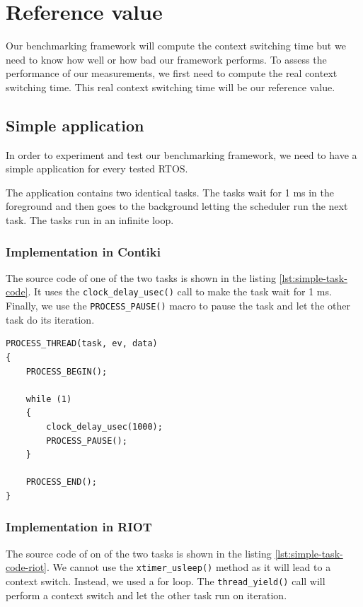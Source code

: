\section{Reference value \label{sec:reference}}

Our benchmarking framework will compute the context switching time but we need to know how well or how bad our framework performs.
To assess the performance of our measurements, we first need to compute the real context switching time.
This real context switching time will be our reference value.

\subsection{Simple application}
In order to experiment and test our benchmarking framework, we need to have a simple application for every tested RTOS.

The application contains two identical tasks.
The tasks wait for 1 ms in the foreground and then goes to the background letting the scheduler run the next task.
The tasks run in an infinite loop.

\subsubsection{Implementation in Contiki}
The source code of one of the two tasks is shown in the listing \ref{lst:simple-task-code}.
It uses the \texttt{clock\_delay\_usec()} call to make the task wait for 1 ms.
Finally, we use the \texttt{PROCESS\_PAUSE()} macro to pause the task and let the other task do its iteration.

\begin{lstlisting}[style=CStyle, float, label={lst:simple-task-code}, caption={source code of a task implemented in Contiki for the simple application}]
PROCESS_THREAD(task, ev, data)
{
    PROCESS_BEGIN();

    while (1)
    {
        clock_delay_usec(1000);
        PROCESS_PAUSE();
    }

    PROCESS_END();
}
\end{lstlisting}

\subsubsection{Implementation in RIOT}
The source code of on of the two tasks is shown in the listing \ref{lst:simple-task-code-riot}.
We cannot use the \texttt{xtimer\_usleep()} method as it will lead to a context switch.
Instead, we used a for loop.
The \texttt{thread\_yield()} call will perform a context switch and let the other task run on iteration.

